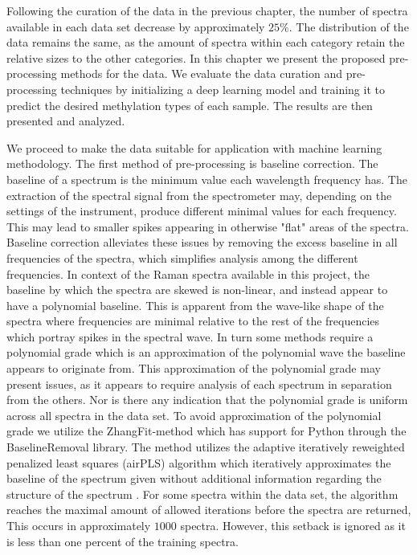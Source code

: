 Following the curation of the data in the previous chapter, the number of spectra available in each data set decrease by approximately $25\%$. The distribution of the data remains the same, as the amount of spectra within each category retain the relative sizes to the other categories. In this chapter we present the proposed pre-processing methods for the data. We evaluate the data curation and pre-processing techniques by initializing a deep learning model and training it to predict the desired methylation types of each sample. The results are then presented and analyzed.

We proceed to make the data suitable for application with machine learning methodology. The first method of pre-processing is baseline correction. The baseline of a spectrum is the minimum value each wavelength frequency has. The extraction of the spectral signal from the spectrometer may, depending on the settings of the instrument, produce different minimal values for each frequency. This may lead to smaller spikes appearing in otherwise "flat" areas of the spectra. Baseline correction alleviates these issues by removing the excess baseline in all frequencies of the spectra, which simplifies analysis among the different frequencies. In context of the Raman spectra available in this project, the baseline by which the spectra are skewed is non-linear, and instead appear to have a polynomial baseline. This is apparent from the wave-like shape of the spectra where frequencies are minimal relative to the rest of the frequencies which portray spikes in the spectral wave. In turn some methods require a polynomial grade which is an approximation of the polynomial wave the baseline appears to originate from. This approximation of the polynomial grade may present issues, as it appears to require analysis of each spectrum in separation from the others. Nor is there any indication that the polynomial grade is uniform across all spectra in the data set. To avoid approximation of the polynomial grade we utilize the ZhangFit-method which has support for Python through the BaselineRemoval library. The method utilizes the adaptive iteratively reweighted penalized least squares (airPLS) algorithm which iteratively approximates the baseline of the spectrum given without additional information regarding the structure of the spectrum \cite{zhang2010baseline}. For some spectra within the data set, the algorithm reaches the maximal amount of allowed iterations before the spectra are returned, This occurs in approximately $1000$ spectra. However, this setback is ignored as it is less than one percent of the training spectra. 

